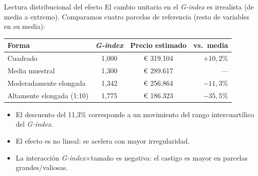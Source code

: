 \documentclass[11pt,aspectratio=169]{beamer}
\newcommand{\Gindex}{\textit{G-index}\xspace}
\begin{document}
\begin{frame}{Lectura distribucional del efecto}
  \footnotesize El cambio unitario en el \Gindex es irrealista (de media a extremo). Comparamos cuatro parcelas de referencia (resto de variables en su media):
  \vspace{0.4em}
  \centering
  \begin{table}\small
  \begin{tabular}{lccr}
    \toprule
    Forma & \Gindex & Precio estimado & vs.\ media \\
    \midrule
    Cuadrado & 1,000 & € 319.104 & $+10{,}2\%$ \\
    \rowcolor{azulsecundario!15} Media muestral & 1,300 & € 289.617 & --- \\
    Moderadamente elongada & 1,342 & € 256.864 & \alert{$-11{,}3\%$} \\
    Altamente elongada (1:10) & 1,775 & € 186.323 & $-35{,}5\%$ \\
    \bottomrule
  \end{tabular}
  \end{table}
  \vspace{0.6em}
  \begin{itemize}\footnotesize
    \item El descuento del 11,3\% corresponde a un movimiento del \alert{rango intercuartílico} del \Gindex.
    \item El efecto es \alert{no lineal}: se acelera con mayor irregularidad.
    \item La interacción \Gindex$\times$tamaño es negativa: el castigo es \alert{mayor en parcelas grandes/valiosas}.
  \end{itemize}
\end{frame}
\end{document}
